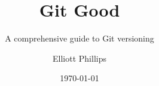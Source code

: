 \title{Git Good}
\subtitle{A comprehensive guide to Git versioning}
\author{Elliott Phillips}
\date{\today}

\frontpage

%
{ %
	\makeatletter
		\@twosidetrue
		\@openrighttrue
	\makeatother
	
	\ifodd\thepage\relax\else\blankpage\fi
	
	
	\setcounter{page}{1}
}








